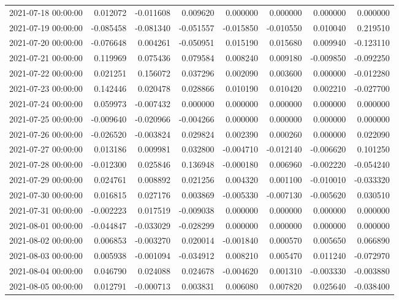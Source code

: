 \begin{tabular}{lrrrrrrr}
2021-07-18 00:00:00 & 0.012072 & -0.011608 & 0.009620 & 0.000000 & 0.000000 & 0.000000 & 0.000000 \\
2021-07-19 00:00:00 & -0.085458 & -0.081340 & -0.051557 & -0.015850 & -0.010550 & 0.010040 & 0.219510 \\
2021-07-20 00:00:00 & -0.076648 & 0.004261 & -0.050951 & 0.015190 & 0.015680 & 0.009940 & -0.123110 \\
2021-07-21 00:00:00 & 0.119969 & 0.075436 & 0.079584 & 0.008240 & 0.009180 & -0.009850 & -0.092250 \\
2021-07-22 00:00:00 & 0.021251 & 0.156072 & 0.037296 & 0.002090 & 0.003600 & 0.000000 & -0.012280 \\
2021-07-23 00:00:00 & 0.142446 & 0.020478 & 0.028866 & 0.010190 & 0.010420 & 0.002210 & -0.027700 \\
2021-07-24 00:00:00 & 0.059973 & -0.007432 & 0.000000 & 0.000000 & 0.000000 & 0.000000 & 0.000000 \\
2021-07-25 00:00:00 & -0.009640 & -0.020966 & -0.004266 & 0.000000 & 0.000000 & 0.000000 & 0.000000 \\
2021-07-26 00:00:00 & -0.026520 & -0.003824 & 0.029824 & 0.002390 & 0.000260 & 0.000000 & 0.022090 \\
2021-07-27 00:00:00 & 0.013186 & 0.009981 & 0.032800 & -0.004710 & -0.012140 & -0.006620 & 0.101250 \\
2021-07-28 00:00:00 & -0.012300 & 0.025846 & 0.136948 & -0.000180 & 0.006960 & -0.002220 & -0.054240 \\
2021-07-29 00:00:00 & 0.024761 & 0.008892 & 0.021256 & 0.004320 & 0.001100 & -0.010010 & -0.033320 \\
2021-07-30 00:00:00 & 0.016815 & 0.027176 & 0.003869 & -0.005330 & -0.007130 & -0.005620 & 0.030510 \\
2021-07-31 00:00:00 & -0.002223 & 0.017519 & -0.009038 & 0.000000 & 0.000000 & 0.000000 & 0.000000 \\
2021-08-01 00:00:00 & -0.044847 & -0.033029 & -0.028299 & 0.000000 & 0.000000 & 0.000000 & 0.000000 \\
2021-08-02 00:00:00 & 0.006853 & -0.003270 & 0.020014 & -0.001840 & 0.000570 & 0.005650 & 0.066890 \\
2021-08-03 00:00:00 & 0.005938 & -0.001094 & -0.034912 & 0.008210 & 0.005470 & 0.011240 & -0.072970 \\
2021-08-04 00:00:00 & 0.046790 & 0.024088 & 0.024678 & -0.004620 & 0.001310 & -0.003330 & -0.003880 \\
2021-08-05 00:00:00 & 0.012791 & -0.000713 & 0.003831 & 0.006080 & 0.007820 & 0.025640 & -0.038400 \\

\end{tabular}
